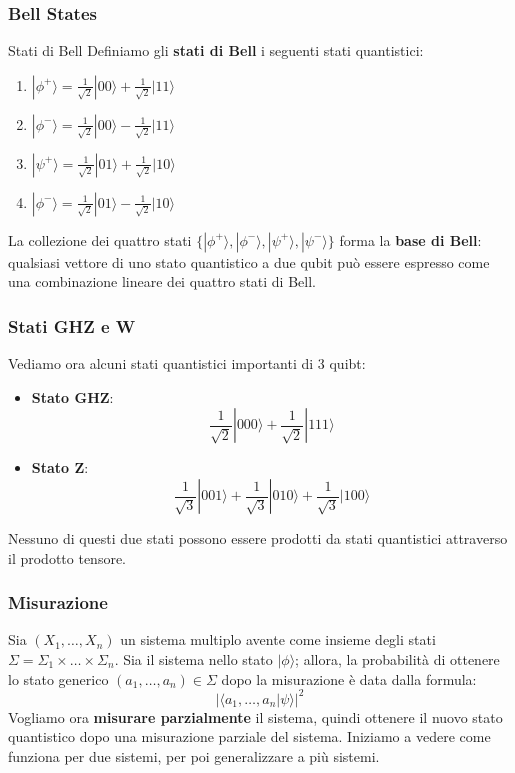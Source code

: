 \subsubsection{Bell States}
\begin{definition}{Stati di Bell}{}
    Definiamo gli \textbf{stati di Bell} i seguenti stati quantistici:
    \begin{enumerate}
        \item $|\phi^+\rangle = \frac{1}{\sqrt{2}}|00\rangle + \frac{1}{\sqrt{2}}|11\rangle$
        \item $|\phi^-\rangle = \frac{1}{\sqrt{2}}|00\rangle - \frac{1}{\sqrt{2}}|11\rangle$
        \item $|\psi^+\rangle = \frac{1}{\sqrt{2}}|01\rangle + \frac{1}{\sqrt{2}}|10\rangle$
        \item $|\phi^-\rangle = \frac{1}{\sqrt{2}}|01\rangle - \frac{1}{\sqrt{2}}|10\rangle$
    \end{enumerate}
\end{definition}
La collezione dei quattro stati $\{|\phi^+\rangle, |\phi^-\rangle, |\psi^+\rangle, |\psi^-\rangle \}$ forma la \textbf{base di Bell}: qualsiasi vettore di uno stato quantistico a due qubit può essere espresso come una combinazione lineare dei quattro stati di Bell.
\subsubsection{Stati GHZ e W}
Vediamo ora alcuni stati quantistici importanti di 3 quibt:
\begin{itemize}
    \item \textbf{Stato GHZ}:
    \begin{equation}
        \frac{1}{\sqrt{2}}|000\rangle +  \frac{1}{\sqrt{2}}|111\rangle 
    \end{equation}
    \item \textbf{Stato Z}:
    \begin{equation}
        \frac{1}{\sqrt{3}}|001\rangle +  \frac{1}{\sqrt{3}}|010\rangle  +  \frac{1}{\sqrt{3}}|100\rangle  
    \end{equation}
\end{itemize}
Nessuno di questi due stati possono essere prodotti da stati quantistici attraverso il prodotto tensore.
\subsubsection{Misurazione}
Sia $(X_1, \hdots, X_n)$ un sistema multiplo avente come insieme degli stati $\Sigma = \Sigma_1 \times \hdots \times \Sigma_n$. Sia il sistema nello stato $|\phi \rangle$; allora, la probabilità di ottenere lo stato generico $(a_1, \hdots, a_n) \in \Sigma$ dopo la misurazione è data dalla formula:
\begin{equation}
    |\langle a_1, \hdots, a_n | \psi \rangle|^2
\end{equation}
Vogliamo ora \textbf{misurare parzialmente} il sistema, quindi ottenere il nuovo stato quantistico dopo una misurazione parziale del sistema. Iniziamo a vedere come funziona per due sistemi, per poi generalizzare a più sistemi.


